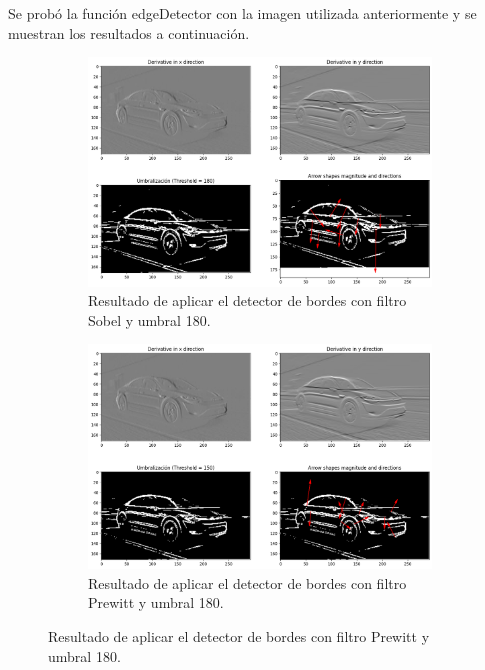 \documentclass{article}
\begin{document}
    \noindent
    Se probó la función edgeDetector con la imagen utilizada anteriormente y se muestran los resultados a continuación.
    \begin{figure}[!ht]
        \centering
        \begin{subfigure}
            \centering
            \includegraphics[width=\linewidth]{img/bordeSobel}
            \caption{ Resultado de aplicar el detector de bordes con filtro Sobel y umbral 180.}
            \label{fig:edgesso}
        \end{subfigure}
        \begin{subfigure}
            \centering
            \includegraphics[width=\linewidth]{img/bordePrewitt}
            \caption{ Resultado de aplicar el detector de bordes con filtro Prewitt y umbral 180.}
            \label{fig:edgespw}
        \end{subfigure}
    \end{figure}
    
\end{document}
